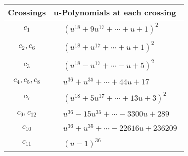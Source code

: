 \documentclass[1p]{elsarticle_modified}
\theoremstyle{definition}
\begin{document}
\begin{tabular}{m{50pt}|m{274pt}}
Crossings & \hspace{64pt}u-Polynomials at each crossing \\
\hline $$\begin{aligned}c_{1}\end{aligned}$$&$\begin{aligned}
&(u^{18}+9 u^{17}+\cdots+u+1)^{2}
\end{aligned}$\\
\hline $$\begin{aligned}c_{2},c_{6}\end{aligned}$$&$\begin{aligned}
&(u^{18}+u^{17}+\cdots+u+1)^{2}
\end{aligned}$\\
\hline $$\begin{aligned}c_{3}\end{aligned}$$&$\begin{aligned}
&(u^{18}- u^{17}+\cdots- u+5)^{2}
\end{aligned}$\\
\hline $$\begin{aligned}c_{4},c_{5},c_{8}\end{aligned}$$&$\begin{aligned}
&u^{36}+u^{35}+\cdots+44 u+17
\end{aligned}$\\
\hline $$\begin{aligned}c_{7}\end{aligned}$$&$\begin{aligned}
&(u^{18}+5 u^{17}+\cdots+13 u+3)^{2}
\end{aligned}$\\
\hline $$\begin{aligned}c_{9},c_{12}\end{aligned}$$&$\begin{aligned}
&u^{36}-15 u^{35}+\cdots-3300 u+289
\end{aligned}$\\
\hline $$\begin{aligned}c_{10}\end{aligned}$$&$\begin{aligned}
&u^{36}+u^{35}+\cdots-22616 u+236209
\end{aligned}$\\
\hline $$\begin{aligned}c_{11}\end{aligned}$$&$\begin{aligned}
&(u-1)^{36}
\end{aligned}$\\
\hline
\end{tabular}\\~\\
\end{document}

